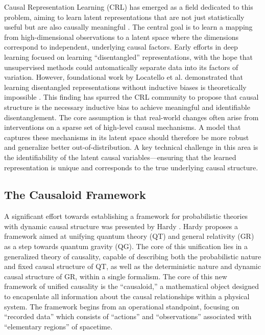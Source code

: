 {Causal Representation Learning (CRL) has emerged as a field dedicated to this problem, aiming to learn latent representations that are not just statistically useful but are also causally meaningful \cite{Scholkopf2021Toward}. The central goal is to learn a mapping from high-dimensional observations to a latent space where the dimensions correspond to independent, underlying causal factors.
Early efforts in deep learning focused on learning ``disentangled'' representations, with the hope that unsupervised methods could automatically separate data into its factors of variation. However, foundational work by Locatello et al. demonstrated that learning disentangled representations without inductive biases is theoretically impossible \cite{Locatello2019Challenging}. This finding has spurred the CRL community to propose that causal structure is the necessary inductive bias to achieve meaningful and identifiable disentanglement. The core assumption is that real-world changes often arise from interventions on a sparse set of high-level causal mechanisms. A model that captures these mechanisms in its latent space should therefore be more robust and generalize better out-of-distribution. A key technical challenge in this area is the identifiability of the latent causal variables—ensuring that the learned representation is unique and corresponds to the true underlying causal structure.

\subsection{The Causaloid Framework}

A significant effort towards establishing a framework for probabilistic theories with dynamic causal structure was presented by Hardy \cite{hardy2005probability}. Hardy proposes a framework aimed at unifying quantum theory (QT) and general relativity (GR) as a step towards quantum gravity (QG). The core of this unification lies in a generalized theory of causality, capable of describing both the probabilistic nature and fixed causal structure of QT, as well as the deterministic nature and dynamic causal structure of GR, within a single formalism. The core of this new framework of unified causality is the ``causaloid,'' a mathematical object designed to encapsulate all information about the causal relationships within a physical system. The framework begins from an operational standpoint, focusing on ``recorded data'' which consists of ``actions'' and ``observations'' associated with ``elementary regions'' of spacetime.

}

